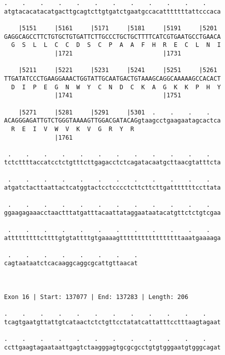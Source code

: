 \documentclass{article}
\begin{document}
\begin{Verbatim}
.    .    .    .    .    .    .    .    .    .    .    .    
atgtacacatacatgacttgcagtcttgtgatctgaatgccacatttttttattcccaca
                                                            
    |5151     |5161     |5171     |5181     |5191     |5201 
GAGGCAGCCTTCTGTGCTGTGATTCTTGCCCTGCTGCTTTTCATCGTGAATGCCTGAACA
  G  S  L  L  C  C  D  S  C  P  A  A  F  H  R  E  C  L  N  I
              |1721                         |1731           
  
    |5211     |5221     |5231     |5241     |5251     |5261 
TTGATATCCCTGAAGGAAACTGGTATTGCAATGACTGTAAAGCAGGCAAAAAGCCACACT
  D  I  P  E  G  N  W  Y  C  N  D  C  K  A  G  K  K  P  H  Y
              |1741                         |1751           
  
    |5271     |5281     |5291     |5301  .    .    .    .   
ACAGGGAGATTGTCTGGGTAAAAGTTGGACGATACAGgtaagcctgaagaatagcactca
  R  E  I  V  W  V  K  V  G  R  Y  R                        
              |1761                                         
  
 .    .    .    .    .    .    .    .    .    .    .    .   
tctcttttaccatcctctgtttcttgagacctctcagatacaatgcttaacgtatttcta
                                                            
 .    .    .    .    .    .    .    .    .    .    .    .   
atgatctacttaattactcatggtactcctcccctcttcttcttgatttttttccttata
                                                            
 .    .    .    .    .    .    .    .    .    .    .    .   
ggaagagaaacctaactttatgatttacaattataggaataatacatgttctctgtcgaa
                                                            
 .    .    .    .    .    .    .    .    .    .    .    .   
atttttttttcttttgtgtattttgtgaaaagtttttttttttttttttaaatgaaaaga
                                                            
 .    .    .    .    .    .    .    .
cagtaataatctcacaaggcaggcgcattgttaacat
                                     
                                     
 
Exon 16 | Start: 137077 | End: 137283 | Length: 206
 
.    .    .    .    .    .    .    .    .    .    .    .    
tcagtgaatgttattgtcataactctctgttcctatatcattatttcctttaagtagaat
                                                            
.    .    .    .    .    .    .    .    .    .    .    .    
ccttgaagtagaataattgagtctaagggagtgcgcgcctgtgtgggaatgtgggcagat
                                                            

\end{Verbatim}
\end{document}
